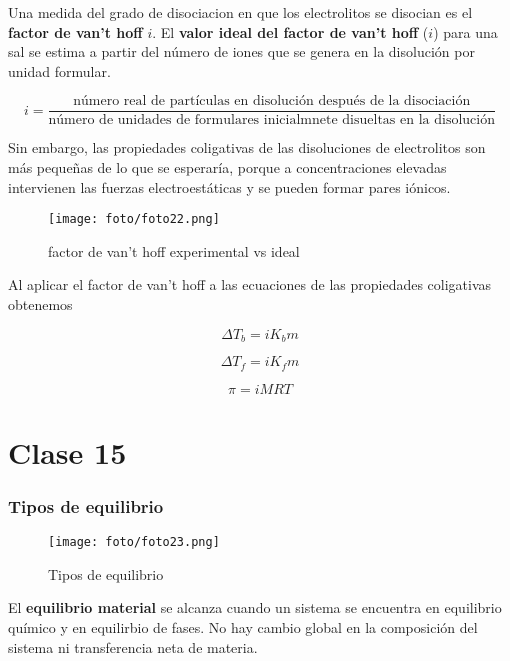 \documentclass[]{article}
\begin{document}
Una medida del grado de disociacion en que los electrolitos se disocian es el \textbf{factor de van't hoff} $i$. El \textbf{valor ideal del factor de van't hoff} ($i$) para una sal se estima a partir del número de iones que se genera en la disolución por unidad formular.

\begin{equation}
i=\frac{\text{número real de partículas en disolución después de la disociación}}{\text{número de unidades de formulares inicialmnete disueltas en la disolución}}
\end{equation}

Sin embargo, las propiedades coligativas de las disoluciones de electrolitos son más pequeñas de lo que se esperaría, porque a concentraciones elevadas intervienen las fuerzas electroestáticas y se pueden formar pares iónicos.

\begin{figure}[H]
\center
\texttt{[image: foto/foto22.png]}
\caption{factor de van't hoff experimental vs ideal}
\end{figure}

Al aplicar el factor de van't hoff a las ecuaciones de las propiedades coligativas obtenemos

\begin{equation}
\Delta T_{b}=iK_{b}m
\end{equation}

\begin{equation}
\Delta T_{f}=iK_{f}m
\end{equation}

\begin{equation}
\pi = iMRT
\end{equation}



\part{Clase 15}



\section{Tipos de equilibrio}
\begin{figure}[H]
\center
\texttt{[image: foto/foto23.png]}
\caption{Tipos de equilibrio}
\end{figure}

El \textbf{equilibrio material} se alcanza cuando un sistema se encuentra en equilibrio químico y en equilirbio de fases. No hay cambio global en la composición del sistema ni transferencia neta de materia.
\end{document}
